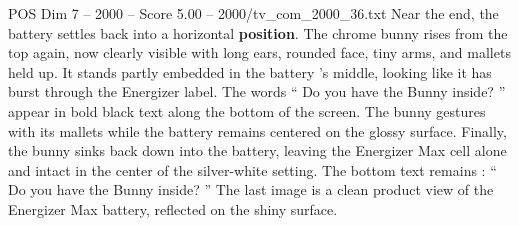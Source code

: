 \begin{textsample}{POS Dim 7 – 2000 – Score 5.00 – 2000/tv\_com\_2000\_36.txt}
Near the end, the battery settles back into a horizontal \textbf{position}.
The chrome bunny rises from the top again, now clearly visible with long ears, rounded face, tiny arms, and mallets held up.
It stands partly embedded in the battery ’s middle, looking like it has burst through the Energizer label.
The words “ Do you have the Bunny inside? ” appear in bold black text along the bottom of the screen.
The bunny gestures with its mallets while the battery remains centered on the glossy surface.
Finally, the bunny sinks back down into the battery, leaving the Energizer Max cell alone and intact in the center of the silver-white setting.
The bottom text remains : “ Do you have the Bunny inside? ” The last image is a clean product view of the Energizer Max battery, reflected on the shiny surface.

\end{textsample}
